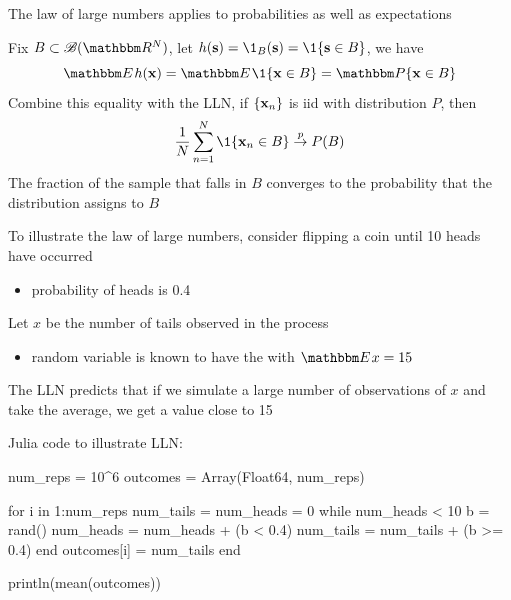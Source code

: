 \begin{frame}

    \vspace{2em}
    The law of large numbers applies to probabilities as well as
    expectations
    
    \vspace{1em}
    Fix $B \subset \bB(\RR^N)$, let $h(\bolds) = \1_B(\bolds) = \1\{\bolds \in B\}$,
    we have
    \begin{equation*}
        \EE h(\boldx)  = \EE \1\{\boldx \in B\}  = \PP \{\boldx \in B\} 
    \end{equation*}
    Combine this equality with the LLN, 
    if $\{{\mathbf x}_n\}$ is {\sc iid} with distribution $P$, then
    \begin{equation*}
        \label{eq:lln0lg}
        \frac{1}{N} \sum_{n=1}^N \1\{\boldx_n \in B\} \toprob P(B)
    \end{equation*}
    The fraction of the sample that falls in $B$
    converges to the probability that the distribution assigns to $B$
    
\end{frame}

\begin{frame}

    \vspace{2em}
    To illustrate the law of large numbers, consider flipping a coin until
    10 heads have occurred
    
    \begin{itemize}
    \item probability of heads is
    0.4
    \end{itemize}
    
    \vspace{1em}
    Let $x$ be the number of tails observed in the process
    \begin{itemize}
        \item random variable is known to have the  with $\EE x =15$
    \end{itemize}
    
    The LLN predicts that 
    if we simulate a large number of observations of $x$ and take the average,
    we get a value close to 15

\end{frame}

\begin{frame}[fragile]

    \vspace{2em}
    Julia code to illustrate LLN:
    \begin{juliacode}
num_reps = 10^6
outcomes = Array(Float64, num_reps)

for i in 1:num_reps
    num_tails = num_heads = 0
    while num_heads < 10
        b = rand()
        num_heads = num_heads + (b < 0.4)   
        num_tails = num_tails + (b >= 0.4) 
    end
    outcomes[i] = num_tails
end

println(mean(outcomes))
    \end{juliacode}

\end{frame}


